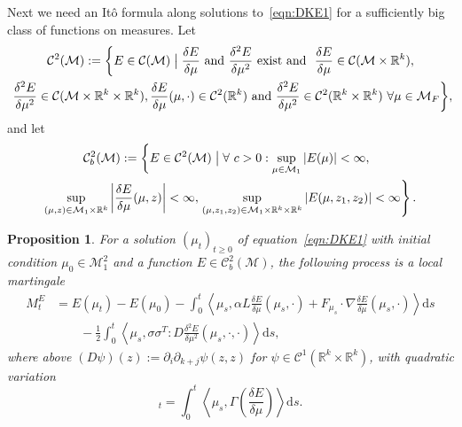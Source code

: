 \documentclass{article}
\newcommand{\dd}{\text{d}}
\newcommand{\av}[1]{\left<#1\right>}
\newtheorem{proposition}[theorem]{Proposition}
\newcommand{\R}{\mathbb{R}}
\newcommand{\C}{\mathcal C}
\newcommand{\cM}{\mathcal M}
\begin{document}
Next we need an It\^o formula along solutions to~\eqref{eqn:DKE1} for a sufficiently big class of functions on
measures. Let
\begin{multline*}
        \C^2(\cM) := \bigg\{E \in \C(\cM) \bigm| \frac{\delta E}{\delta \mu} \text{ and }\frac{\delta^2 E}{\delta \mu^2}  ~\text{exist and }~ \frac{\delta E}{\delta \mu} \in \C(\cM \times \R^k),\\ ~\frac{\delta^2 E}{\delta \mu^2} \in \C(\cM \times \R^k \times \R^k), \frac{\delta E}{\delta \mu}(\mu, \cdot) \in \C^2(\R^k) \text{ and}~ \frac{\delta^2 E}{\delta \mu^2} \in \C^2(\R^k \times \R^k) ~ \forall \mu \in \cM_F \bigg\}, 
        \end{multline*}
    and   let 
    \begin{multline*}
    \C^2_b(\cM) := \left\{ E \in \C^2(\cM)  \bigm|  \forall~ c > 0: \sup_{ \mu \in \mathcal M_1}|E(\mu)|< \infty,~ \right.\\ \sup_{ (\mu, z) \in \mathcal M_1 \times \R^k}\left|\frac{\delta E}{\delta \mu}(\mu, z)\right| < \infty,
    \left.\sup_{ (\mu, z_1, z_2) \in \mathcal M_1 \times \R^k \times \R^k}|E(\mu, z_1, z_2)| < \infty
    \right\}.
\end{multline*}


\begin{proposition} 
  \label{prop:itof_basic}
  For a solution $(\mu_t)_{t \geq 0}$ of equation~\eqref{eqn:DKE1} with initial condition $\mu_0 \in \cM^2_1$
  and a function $E \in \C_b^2(\mathcal M)$, the following process is a local martingale
  \begin{align*}
    M_t^E &=  E(\mu_t) - E(\mu_0) - \int_0^t \av{\mu_s, \alpha L \frac{\delta E}{\delta \mu}(\mu_s, \cdot) + F_{\mu_s} \cdot  \nabla \frac{\delta E}{\delta \mu}(\mu_s, \cdot) } \dd s\\
          &\qquad{} - \frac{1}{2} \int_0^t \av{\mu_s, \sigma \sigma^T:D  \frac{\delta^2 E}{\delta \mu^2}(\mu_s, \cdot,\cdot)} \dd s,
  \end{align*}
  where above $(D \psi)(z) := \partial_i \partial_{k+j} \psi(z, z)$ for $\psi \in \C^1(\R^k \times \R^k)$,
  with quadratic variation
  \begin{equation*}
    [M_\cdot^E]_t = \int_0^t \av{\mu_s, \Gamma\left( \frac{\delta E}{\delta \mu} \right)} \dd s. 
  \end{equation*}
 \end{proposition}
\end{document}
